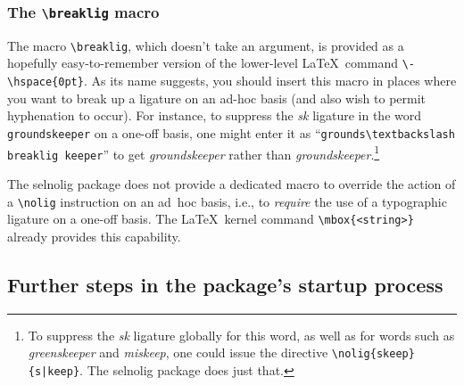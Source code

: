 \documentclass[11pt]{article}
\newcommand{\pkg}[1]{\textsf{#1}}
\newcommand{\cmmd}[1]{\texttt{\textbackslash #1}}
\begin{document}
\subsubsection{The \cmmd{breaklig} macro} 
\label{sec:breaklig}

The macro \cmmd{breaklig}, which doesn't take an argument, is provided as a hopefully easy-to-remember version of the lower-level \LaTeX\ command \Verb+\-\hspace{0pt}+. As its name suggests, you should insert this macro in places where you want to break up a ligature on an ad-hoc basis (and also wish to permit hyphenation to occur). For instance, to suppress the \emph{\mbox{sk}} ligature in the word \Verb+groundskeeper+ on a one-off basis, one might enter it as \enquote{\Verb+grounds\textbackslash breaklig keeper+} to get \emph{\ebg groundskeeper} rather than \emph{\ebg ground\mbox{sk}eeper}.\footnote{To suppress the {\ebg \emph{\mbox{sk}}} ligature globally for this word, as well as for words such as \emph{\ebg greenskeeper} and \emph{\ebg miskeep}, one could issue the directive \Verb+\nolig{skeep}{s|keep}+. The \pkg{selnolig} package does just that.}


The \pkg{selnolig} package does not provide a dedicated macro to override the action of a \cmmd{nolig} instruction on an ad~hoc basis, i.e., to \emph{require} the use of a typographic ligature on a one-off basis. The \LaTeX\ kernel command \Verb+\mbox{<string>}+ already provides this capability.


\subsection{Further steps in the package's startup process}
\end{document}

